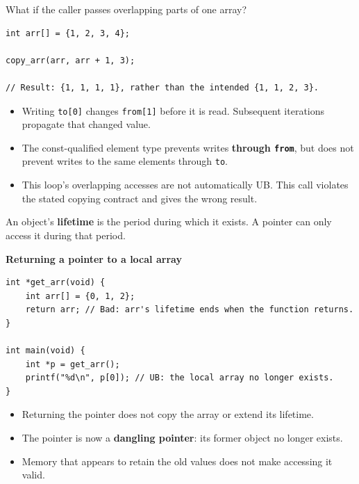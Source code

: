 \documentclass[11pt,a4paper]{article}
\begin{document}
What if the caller passes overlapping parts of one array?

\begin{lstlisting}[style=cscode]
int arr[] = {1, 2, 3, 4};

copy_arr(arr, arr + 1, 3);

// Result: {1, 1, 1, 1}, rather than the intended {1, 1, 2, 3}.
\end{lstlisting}

\begin{itemize}
    \item Writing \texttt{to[0]} changes \texttt{from[1]} before
          it is read. Subsequent iterations propagate that
          changed value.
    \item The const-qualified element type prevents writes
          \textbf{through \texttt{from}}, but does not prevent
          writes to the same elements through \texttt{to}.
    \item This loop's overlapping accesses are not automatically
          UB. This call violates the stated copying contract
          and gives the wrong result.
\end{itemize}


An object's \textbf{lifetime} is the period during which it exists.
A pointer can only access it during that period.

\textbf{Returning a pointer to a local array}

\begin{lstlisting}[style=cscode]
int *get_arr(void) {
    int arr[] = {0, 1, 2};
    return arr; // Bad: arr's lifetime ends when the function returns.
}

int main(void) {
    int *p = get_arr();
    printf("%d\n", p[0]); // UB: the local array no longer exists.
}
\end{lstlisting}

\begin{itemize}
    \item Returning the pointer does not copy the array or
          extend its lifetime.
    \item The pointer is now a \textbf{dangling pointer}:
          its former object no longer exists.
    \item Memory that appears to retain the old values does not
          make accessing it valid.
\end{itemize}
\end{document}
